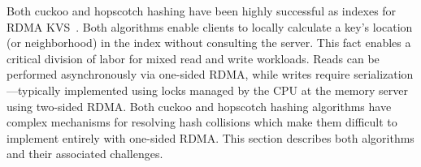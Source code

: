 



Both cuckoo and hopscotch hashing have been highly successful as
indexes for RDMA
KVS~\cite{farm,memc3,reno,cuckoo-improvements,pilaf}. Both algorithms
enable clients to locally calculate a key's location (or neighborhood)
in the index without consulting the server. This fact enables a
critical division of labor for mixed read and write workloads. Reads
can be performed asynchronously via one-sided RDMA, while writes
require serialization---typically implemented using locks managed by
the CPU at the memory server using two-sided RDMA.  Both cuckoo and hopscotch hashing algorithms
have complex mechanisms for resolving hash collisions which make them
difficult to implement entirely with one-sided RDMA. This section
describes both algorithms and their associated challenges.

